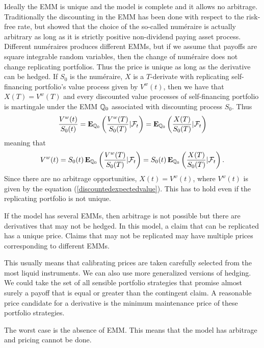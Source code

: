 Ideally the EMM is unique and the model is complete and it allows no arbitrage. Traditionally the discounting in the EMM has been done with respect to the risk-free rate, but \textcite{gemanelkarouirochet1995changes} showed that the choice of the so-called num\'{e}raire is actually arbitrary as long as it is strictly positive non-dividend paying asset process. Different num\'{e}raires produces different EMMs, but if we assume that payoffs are square integrable random variables, then the change of num\'{e}raire does not change replicating portfolios. Thus the price is unique as long as the derivative can be hedged. If $S_0$ is the num\'{e}raire, $X$ is a $T$-derivate with replicating self-financing portfolio's value process given by $V^w(t)$, then we have that $X(T) = V^w(T)$ and every discounted value processes of self-financing portfolio is martingale under the EMM $\mathbb{Q}_0$ associated with discounting process $S_0$. Thus
  \begin{align}
    \frac{V^w(t) }{ S_0(t) } = \operatorname{\boldsymbol{\mathrm{E}}}_{\mathbb{Q}_0} \left( \frac{V^w(T)}{S_0(T)} | \mathcal{F}_t \right) = \operatorname{\boldsymbol{\mathrm{E}}}_{\mathbb{Q}_0} \left( \frac{X(T)}{S_0(T)} | \mathcal{F}_t \right)
  \end{align}
meaning that 
  \begin{align}
    \label{discountedexpectedvalue}
    V^w(t) = S_0(t) \operatorname{\boldsymbol{\mathrm{E}}}_{\mathbb{Q}_0} \left( \frac{V^w(T)}{S_0(T)} | \mathcal{F}_t \right) = S_0(t) \operatorname{\boldsymbol{\mathrm{E}}}_{\mathbb{Q}_0} \left( \frac{X(T)}{S_0(T)} | \mathcal{F}_t \right) .
  \end{align}
Since there are no arbitrage opportunities, $X(t) = V^w(t)$, where $V^w(t)$ is given by the equation (\ref{discountedexpectedvalue}). This has to hold even if the replicating portfolio is not unique.

If the model has several EMMs, then arbitrage is not possible but there are derivatives that may not be hedged. In this model, a claim that can be replicated has a unique price. Claims that may not be replicated may have multiple prices corresponding to different EMMs. 

This usually means that calibrating prices are taken carefully selected from the most liquid instruments. We can also use more generalized versions of hedging. We could take the set of all sensible portfolio strategies that promise almost surely a payoff that is equal or greater than the contingent claim. A reasonable price candidate for a derivative is the minimum maintenance price of these portfolio strategies.

The worst case is the absence of EMM. This means that the model has arbitrage and pricing cannot be done.

